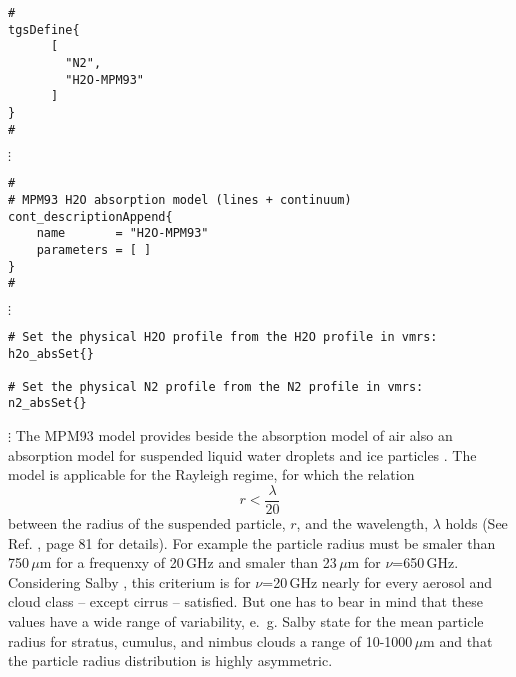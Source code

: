 {

\begin{verbatim}
#
tgsDefine{
      [ 
        "N2",
        "H2O-MPM93"
      ] 
}
#
\end{verbatim}
$\vdots$
\begin{verbatim}
#
# MPM93 H2O absorption model (lines + continuum)
cont_descriptionAppend{
    name       = "H2O-MPM93"
    parameters = [ ]
}
#
\end{verbatim}
$\vdots$
\begin{verbatim}
# Set the physical H2O profile from the H2O profile in vmrs:
h2o_absSet{}

# Set the physical N2 profile from the N2 profile in vmrs:
n2_absSet{}
\end{verbatim}
$\vdots$
%
%
%
%
\label{subsec:lipartabs}
% 
The MPM93 model provides beside the absorption model of air also 
an absorption model for suspended liquid water droplets and ice 
particles \cite{liebe:89b,liebeetal:91,hufford:91,liebeetal:93}. 
The model is applicable for the Rayleigh regime, for which the
relation  
\begin{equation}
 \label{eq:MPM93ralrel}
 r < \frac{\lambda}{20}
\end{equation} 
between the radius of the suspended particle, $r$, and the 
wavelength, $\lambda$ holds (See Ref. \cite{brussaard:95}, 
page 81 for details). For example the particle radius must be 
smaler than 750\,$\mu$m for a frequenxy of 20\,GHz and smaler than 
23\,$\mu$m for $\nu$=650\,GHz. Considering Salby \cite{salby:96}, 
this criterium is for $\nu$=20\,GHz nearly for every aerosol and 
cloud class -- except cirrus -- satisfied. But one has to bear in mind
that these values have a wide range of variability, e.~g. Salby
state for the mean particle radius for stratus, cumulus, and nimbus
clouds a range of 10-1000\,$\mu$m and that the particle radius
distribution is highly asymmetric.

}
